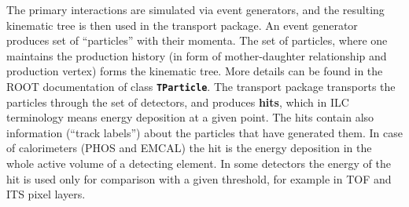 \documentclass[12pt,a4paper,twoside]{article}
\newcommand{\class}[1]{\texttt{\textbf{#1}}\xspace}
\begin{document}
The primary  interactions are simulated via event  generators, and the
resulting kinematic  tree is then  used in the transport  package.  An
event generator produces set  of ``particles'' with their momenta. The
set of particles, where one  maintains the production history (in form
of  mother-daughter  relationship  and  production vertex)  forms  the
kinematic tree. More details can be found in the ROOT documentation of
class  \class{TParticle}.    The  transport  package   transports  the
particles through  the set  of detectors, and  produces \textbf{hits},
which  in  ILC  terminology  means  energy  deposition  at  a  given
point. The hits contain  also information (``track labels'') about the
particles that have generated them.  In case of calorimeters (PHOS and
EMCAL) the hit is the energy  deposition in the whole active volume of
a detecting element.  In some detectors the energy of  the hit is used
only for comparison with a given threshold, for example in TOF and ITS
pixel layers.
\end{document}
